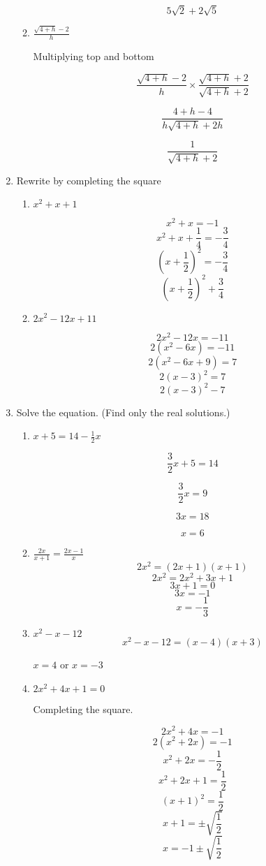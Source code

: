 \documentclass{article}
\begin{document}
\begin{enumerate}
\begin{enumerate}
			$$5\sqrt{2} + 2\sqrt{5}$$

		\item $\frac{\sqrt{4 + h} - 2}{h}$

			Multiplying top and bottom

			$$\frac{\sqrt{4 + h} - 2}{h} \times \frac{\sqrt{4+h} + 2}{\sqrt{4+h} + 2}$$

			$$\frac{4 + h - 4}{h\sqrt{4 + h} + 2h}$$

			$$\frac{1}{\sqrt{4 + h} + 2}$$
	\end{enumerate}
	\item Rewrite by completing the square

	\begin{enumerate}
		\item $x^2 + x + 1$

			$$x^2 + x = -1$$
			$$x^2 + x + \frac{1}{4} = -\frac{3}{4}$$
			$$(x + \frac{1}{2})^2 = -\frac{3}{4}$$
			$$(x + \frac{1}{2})^2 + \frac{3}{4}$$

		\item $2x^2 - 12x + 11$

			$$2x^2 -12x = -11$$
			$$2(x^2 - 6x) = -11$$
			$$2(x^2 -6x + 9) = 7$$
			$$2(x - 3)^2 = 7$$
			$$2(x-3)^2 - 7$$
	\end{enumerate}
	\item Solve the equation. (Find only the real solutions.)
	\begin{enumerate}
		\item $x + 5 = 14 - \frac{1}{2}x$

			$$\frac{3}{2}x + 5 = 14$$

			$$\frac{3}{2}x = 9$$

			$$3x = 18$$

			$$x = 6$$

		\item $\frac{2x}{x + 1} = \frac{2x-1}{x}$
			$$2x^2 = (2x + 1)(x+1)$$
			$$2x^2 = 2x^2 + 3x + 1$$
			$$3x + 1 = 0$$
			$$3x = -1$$
			$$x = -\frac{1}{3}$$

		\item $ x^2 - x - 12$
			$$x^2 - x - 12 = (x-4)(x+3)$$

			$x = 4$ or $x = -3$

		\item $2x^2 + 4x + 1 = 0$

			Completing the square.

			$$2x^2 + 4x = -1$$
			$$2(x^2 + 2x) = -1$$
			$$x^2 + 2x = - \frac{1}{2}$$
			$$x^2 + 2x + 1 = \frac{1}{2}$$
			$$(x+1)^2 = \frac{1}{2}$$
			$$x + 1 = \pm \sqrt{\frac{1}{2}}$$
			$$ x = -1 \pm \sqrt{\frac{1}{2}}$$


\end{enumerate}
\end{enumerate}
\end{document}
